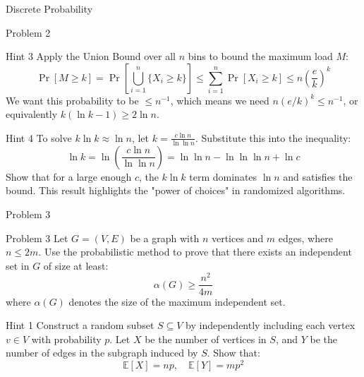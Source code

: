 \documentclass{beamer}
\begin{document}
\begin{section}{Discrete Probability}
\begin{subsection}{Problem 2}
    \begin{frame}
        \begin{block}{Hint 3}
            Apply the Union Bound over all $n$ bins to bound the maximum load $M$:
            \[
                \Pr[M \ge k] = \Pr\left[ \bigcup_{i=1}^n \{X_i \ge k\} \right] \le \sum_{i=1}^n \Pr[X_i \ge k] \le n \left( \frac{e}{k} \right)^k
            \]
            We want this probability to be $\le n^{-1}$, which means we need $n (e/k)^k \le n^{-1}$, or equivalently $k (\ln k - 1) \ge 2 \ln n$.
        \end{block}
    \end{frame} 

    \begin{frame}
        \begin{block}{Hint 4}
            To solve $k \ln k \approx \ln n$, let $k = \frac{c \ln n}{\ln \ln n}$. Substitute this into the inequality:
            \[
                \ln k = \ln \left( \frac{c \ln n}{\ln \ln n} \right) = \ln \ln n - \ln \ln \ln n + \ln c
            \]
            Show that for a large enough $c$, the $k \ln k$ term dominates $\ln n$ and satisfies the bound. This result highlights the "power of choices" in randomized algorithms.
        \end{block}
    \end{frame}
\end{subsection}

\begin{subsection}{Problem 3}
    \begin{frame}
        \begin{block}{Problem 3}
            Let $G = (V, E)$ be a graph with $n$ vertices and $m$ edges, where $n \le 2m$. Use the probabilistic method to prove that there exists an independent set in $G$ of size at least:
            \[
                \alpha(G) \ge \frac{n^2}{4m}
            \]
            where $\alpha(G)$ denotes the size of the maximum independent set.
        \end{block}
    \end{frame}

    \begin{frame}
        \begin{block}{Hint 1}
            Construct a random subset $S \subseteq V$ by independently including each vertex $v \in V$ with probability $p$. 
            Let $X$ be the number of vertices in $S$, and $Y$ be the number of edges in the subgraph induced by $S$.
            Show that:
            \[
                \mathbb{E}[X] = np, \quad \mathbb{E}[Y] = mp^2
            \]
        \end{block}


\end{frame}
\end{subsection}
\end{section}
\end{document}
